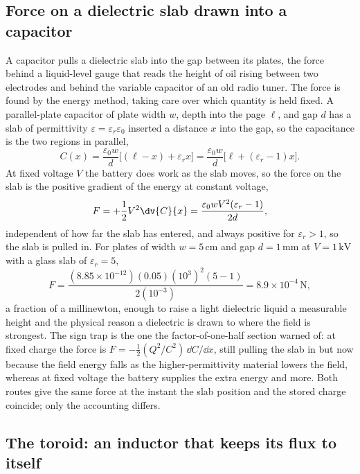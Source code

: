 

\subsection{Force on a dielectric slab drawn into a capacitor}

A capacitor pulls a dielectric slab into the gap between its plates, the
force behind a liquid-level gauge that reads the height of oil rising
between two electrodes and behind the variable capacitor of an old radio
tuner. The force is found by the energy method, taking care over which
quantity is held fixed. A parallel-plate capacitor of plate width $w$,
depth into the page $\ell$, and gap $d$ has a slab of permittivity
$\varepsilon = \varepsilon_r\varepsilon_0$ inserted a distance $x$ into the
gap, so the capacitance is the two regions in parallel,
\[
C(x) = \frac{\varepsilon_0 w}{d}\bigl[(\ell - x) + \varepsilon_r x\bigr] =
\frac{\varepsilon_0 w}{d}\bigl[\ell + (\varepsilon_r - 1)x\bigr].
\]
At fixed voltage $V$ the battery does work as the slab moves, so the force
on the slab is the positive gradient of the energy at constant voltage,
\[
F = +\frac{1}{2}V^{2}\dv{C}{x} = \frac{\varepsilon_0 w V^{2}(\varepsilon_r
- 1)}{2 d},
\]
independent of how far the slab has entered, and always positive for
$\varepsilon_r > 1$, so the slab is pulled in. For plates of width $w =
5\,\si{\centi\meter}$ and gap $d = 1\,\si{\milli\meter}$ at $V = 1\,\si{
\kilo\volt}$ with a glass slab of $\varepsilon_r = 5$,
\[
F = \frac{(8.85\times 10^{-12})(0.05)(10^{3})^{2}(5 - 1)}{2(10^{-3})} =
8.9\times 10^{-4}\,\si{\newton},
\]
a fraction of a millinewton, enough to raise a light dielectric liquid a
measurable height and the physical reason a dielectric is drawn to where
the field is strongest. The sign trap is the one the factor-of-one-half
section warned of: at fixed charge the force is $F = -\tfrac12(Q^2/C^2)
\,\dd C/\dd x$, still pulling the slab in but now because the field energy
falls as the higher-permittivity material lowers the field, whereas at
fixed voltage the battery supplies the extra energy and more. Both routes
give the same force at the instant the slab position and the stored charge
coincide; only the accounting differs.

\subsection{The toroid: an inductor that keeps its flux to itself}

